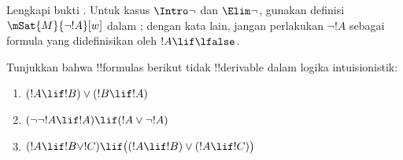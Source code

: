 \documentclass[../../../include/open-logic-section]{subfiles}
\begin{document}
\begin{prob}
  Lengkapi bukti . Untuk kasus
  $\Intro\lnot$ dan $\Elim\lnot$, gunakan definisi
  $\mSat{M}{\lnot !A}[w]$ dalam
  ; dengan kata lain, jangan perlakukan
  $\lnot !A$ sebagai formula yang didefinisikan oleh
  $!A \lif \lfalse$.
\end{prob}

\begin{prob}
  Tunjukkan bahwa !!{formula}s berikut tidak !!{derivable} dalam logika
  intuisionistik:
  \begin{enumerate}
    \item $(!A \lif !B) \lor (!B \lif !A)$
    \item $(\lnot\lnot !A \lif !A) \lif (!A \lor \lnot !A)$
    \item $(!A \lif !B \lor !C) \lif \bigl((!A \lif !B)\lor(!A \lif !C)\bigr)$
  \end{enumerate}
\end{prob}
\end{document}
